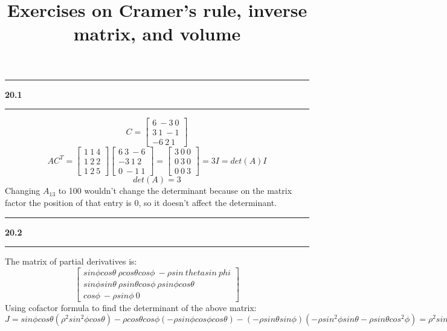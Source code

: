 \documentclass[11pt]{article}
\newcommand\question[2]{\vspace{.25in}\hrule\textbf{#1 #2}\vspace{.5em}\hrule\vspace{.10in}}
\begin{document}
\raggedright
\newcommand\NAME{Haiying Cui}  %
\newcommand\ANDREWID{Christy}     %
\newcommand\HWNUM{20}              %

\title{Exercises on Cramer's rule, inverse matrix, and volume}
\maketitle

\question{20.1}{}
$$C = \begin{bmatrix} 6 \ -3 \ 0 \\ 3 \ 1 \ -1 \\ -6 \ 2 \ 1 \end{bmatrix}$$
$$AC^T = \begin{bmatrix} 1 \ 1 \ 4 \\ 1 \ 2 \ 2 \\ 1 \ 2 \ 5 \end{bmatrix}\begin{bmatrix} 6 \ 3 \ -6 \\ -3 \ 1 \ 2 \\ 0 \ -1 \ 1 \end{bmatrix} = \begin{bmatrix} 3 \ 0 \ 0 \\ 0 \ 3 \ 0 \\ 0 \ 0 \ 3 \end{bmatrix} = 3I = det(A)I$$
$$det(A) = 3$$
Changing \(A_{13}\) to 100 wouldn't change the determinant because on the matrix factor the position of that entry is 0, so it doesn't affect the determinant.

\question{20.2}{}
The matrix of partial derivatives is:
$$\begin{bmatrix} sin\phi cos\theta \ \rho cos\theta cos \phi \ -\rho sin \ theta sin \ phi \\ sin \phi sin \theta \ \rho sin \theta cos \phi \ \rho sin \phi cos \theta \\ cos \phi \ -\rho sin \phi \ 0\end{bmatrix}$$
Using cofactor formula to find the determinant of the above matrix:
\(J = sin\phi cos\theta (\rho^2 sin^2\phi cos\theta) - \rho cos\theta cos\phi(-\rho sin\phi cos\phi cos\theta) -
 (-\rho sin\theta sin\phi)(-\rho sin^2\phi sin\theta - \rho sin\theta cos^2\phi) = \rho^2 sin^3\phi cos^2\theta + \rho^2 sin\phi cos^2\phi cos^2\theta + \rho^2 sin^3\phi sin^2 \theta + \rho^2 sin^2\theta sin\phi cos^2\phi = \rho^2 sin^3\phi + \rho^2 sin\phi cos^2\phi = \rho^2 sin\phi\)
\end{document}
